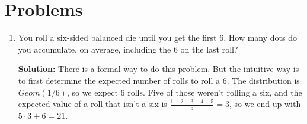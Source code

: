 \documentclass{article}
\newenvironment{solution}{

            \color{blue} \smallskip \textbf{Solution:}}{}
\begin{document}
        \section{Problems}
        \begin{enumerate}
            \item You roll a six-sided balanced die until you get the first 6. How many dots do you accumulate, on average, including the 6 on the last roll?
            \begin{solution}
                There is a formal way to do this problem. But the intuitive way is to first determine the expected number of rolls to roll a 6. The distribution is $Geom(1/6)$, so we expect
                $6$ rolls. Five of those weren't rolling a six, and the expected value of a roll that isn't a six is $\frac{1+2+3+4+5}{5} = 3$, so we end up with $5 \cdot 3 + 6 = 21$. 


\end{solution}
\end{enumerate}
\end{document}
